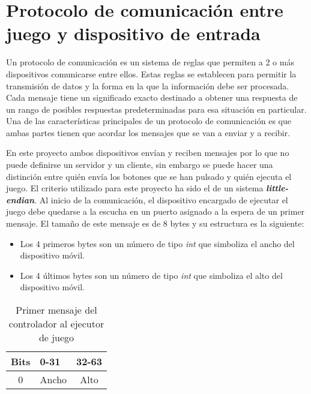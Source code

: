 \section{Protocolo de comunicaci\'on entre juego y dispositivo de entrada}

Un protocolo de comunicaci\'on es un sistema de reglas que permiten a 2 o m\'as dispositivos comunicarse entre ellos. Estas reglas se establecen para permitir la transmisi\'on de datos y la forma en la que la informaci\'on debe ser procesada. Cada mensaje tiene un significado exacto destinado a obtener una respuesta de un rango de posibles respuestas predeterminadas para esa situaci\'on en particular. Una de las caracter\'isticas principales de un protocolo de comunicaci\'on es que ambas partes tienen que acordar los mensajes que se van a enviar y a recibir. 

En este proyecto ambos dispositivos env\'ian y reciben mensajes por lo que no puede definirse un servidor y un cliente, sin embargo se puede hacer una distinci\'on entre qui\'en env\'ia los botones que se han pulsado y qui\'en ejecuta el juego. El criterio utilizado para este proyecto ha sido el de un sistema \textbf{\textit{little-endian}}. Al inicio de la comunicaci\'on, el dispositivo encargado de ejecutar el juego debe quedarse a la escucha en un puerto asignado a la espera de un primer mensaje. El tama\~no de este mensaje es de 8 bytes y su estructura es la siguiente:

\begin {itemize}
\item Los 4 primeros bytes son un n\'umero de tipo \textit{int} que simboliza el ancho del dispositivo m\'ovil.
\item Los 4 \'ultimos bytes son un n\'umero de tipo \textit{int} que simboliza el alto del dispositivo m\'ovil.
\end {itemize}

\begin{table}[h!]
\centering
\begin{tabular}{|l|l|l|} 
\hline
Bits                    & 0-31                   & 32-63                   \\
\hline
\multicolumn{1}{|c|}{0} & \multicolumn{1}{c|}{Ancho} & \multicolumn{1}{c|}{Alto}  \\
\hline
\end{tabular}
\caption{Primer mensaje del controlador al ejecutor de juego}
\label{table:2}
\end{table}


